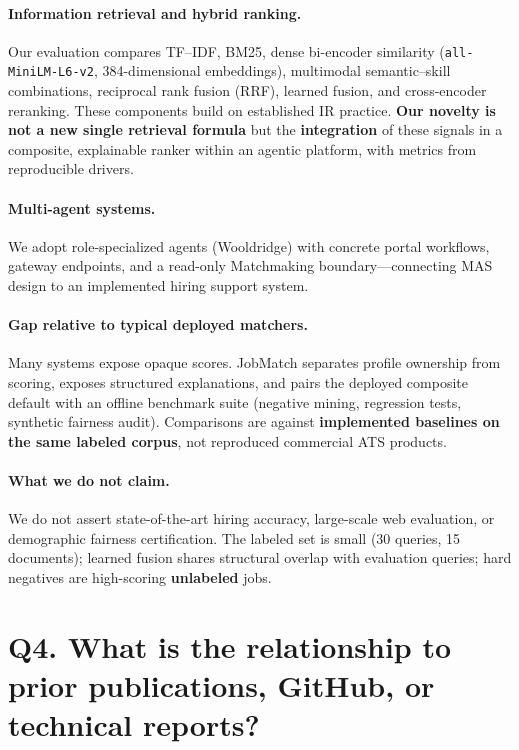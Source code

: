 \documentclass[11pt,a4paper]{article}
\begin{document}
\paragraph{Information retrieval and hybrid ranking.}
Our evaluation compares TF--IDF, BM25, dense bi-encoder similarity (\texttt{all-MiniLM-L6-v2}, 384-dimensional embeddings), multimodal semantic--skill combinations, reciprocal rank fusion (RRF), learned fusion, and cross-encoder reranking. These components build on established IR practice. \textbf{Our novelty is not a new single retrieval formula} but the \textbf{integration} of these signals in a composite, explainable ranker within an agentic platform, with metrics from reproducible drivers.

\paragraph{Multi-agent systems.}
We adopt role-specialized agents (Wooldridge) with concrete portal workflows, gateway endpoints, and a read-only Matchmaking boundary---connecting MAS design to an implemented hiring support system.

\paragraph{Gap relative to typical deployed matchers.}
Many systems expose opaque scores. JobMatch separates profile ownership from scoring, exposes structured explanations, and pairs the deployed composite default with an offline benchmark suite (negative mining, regression tests, synthetic fairness audit). Comparisons are against \textbf{implemented baselines on the same labeled corpus}, not reproduced commercial ATS products.

\paragraph{What we do not claim.}
We do not assert state-of-the-art hiring accuracy, large-scale web evaluation, or demographic fairness certification. The labeled set is small (30 queries, 15 documents); learned fusion shares structural overlap with evaluation queries; hard negatives are high-scoring \textbf{unlabeled} jobs.

\section*{Q4. What is the relationship to prior publications, GitHub, or technical reports?}
\end{document}
